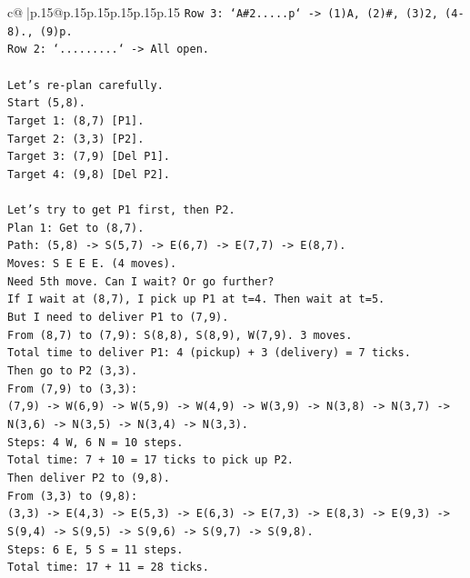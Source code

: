 \documentclass{article}
\begin{document}
{\begin{supertabular}{c@{$\;$}|p{.15\linewidth}@{}p{.15\linewidth}p{.15\linewidth}p{.15\linewidth}p{.15\linewidth}p{.15\linewidth}}
{{{\texttt{Row 3: `A\#2.....p` {-}> (1)A, (2)\#, (3)2, (4{-}8)., (9)p.} \\
\texttt{Row 2: `.........` {-}> All open.} \\
\\ 
\texttt{Let's re{-}plan carefully.} \\
\texttt{Start (5,8).} \\
\texttt{Target 1: (8,7) {[}P1{]}.} \\
\texttt{Target 2: (3,3) {[}P2{]}.} \\
\texttt{Target 3: (7,9) {[}Del P1{]}.} \\
\texttt{Target 4: (9,8) {[}Del P2{]}.} \\
\\ 
\texttt{Let's try to get P1 first, then P2.} \\
\texttt{Plan 1: Get to (8,7).} \\
\texttt{Path: (5,8) {-}> S(5,7) {-}> E(6,7) {-}> E(7,7) {-}> E(8,7).} \\
\texttt{Moves: S E E E. (4 moves).} \\
\texttt{Need 5th move. Can I wait? Or go further?} \\
\texttt{If I wait at (8,7), I pick up P1 at t=4. Then wait at t=5.} \\
\texttt{But I need to deliver P1 to (7,9).} \\
\texttt{From (8,7) to (7,9): S(8,8), S(8,9), W(7,9). 3 moves.} \\
\texttt{Total time to deliver P1: 4 (pickup) + 3 (delivery) = 7 ticks.} \\
\texttt{Then go to P2 (3,3).} \\
\texttt{From (7,9) to (3,3):} \\
\texttt{(7,9) {-}> W(6,9) {-}> W(5,9) {-}> W(4,9) {-}> W(3,9) {-}> N(3,8) {-}> N(3,7) {-}> N(3,6) {-}> N(3,5) {-}> N(3,4) {-}> N(3,3).} \\
\texttt{Steps: 4 W, 6 N = 10 steps.} \\
\texttt{Total time: 7 + 10 = 17 ticks to pick up P2.} \\
\texttt{Then deliver P2 to (9,8).} \\
\texttt{From (3,3) to (9,8):} \\
\texttt{(3,3) {-}> E(4,3) {-}> E(5,3) {-}> E(6,3) {-}> E(7,3) {-}> E(8,3) {-}> E(9,3) {-}> S(9,4) {-}> S(9,5) {-}> S(9,6) {-}> S(9,7) {-}> S(9,8).} \\
\texttt{Steps: 6 E, 5 S = 11 steps.} \\
\texttt{Total time: 17 + 11 = 28 ticks.} \\
}}}
\end{supertabular}}
\end{document}
